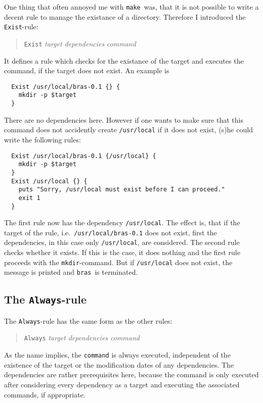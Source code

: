 \documentclass[12pt]{article}
\newcommand{\bras}{\texttt{bras}}
\newcommand{\make}{\texttt{make}}
\begin{document}
One thing that often annoyed me with \make\ was, that it is not
possible to write a decent rule to manage the existance of a
directory. Therefore I introduced the \texttt{Exist}-rule:
\begin{quote}
  \texttt{Exist} \textit{target} \textit{dependencies} \textit{command}
\end{quote}
It defines a rule which checks for the existance of the target and
executes the command, if the target does not exist.
An example is
\begin{verbatim}
  Exist /usr/local/bras-0.1 {} {
    mkdir -p $target
  }
\end{verbatim}
There are no dependencies here. However if one wants to make
sure that this command does not accidently create \texttt{/usr/local}
if it does not exist, (s)he could write the following rules:
\begin{verbatim}
  Exist /usr/local/bras-0.1 {/usr/local} {
    mkdir -p $target
  }
  Exist /usr/local {} {
    puts "Sorry, /usr/local must exist before I can proceed."
    exit 1
  }	
\end{verbatim}
The first rule now has the dependency \texttt{/usr/local}. The effect
is, that if the target of the rule, i.e.\ \texttt{/usr/local/bras-0.1}
does not exist, first the dependencies, in this case only
\texttt{/usr/local}, are considered. The second rule checks
whether it exists. If this is the case, it does nothing and the first
rule proceeds with the \texttt{mkdir}-command. But if
\texttt{/usr/local} does not exist, the message is printed and \bras\
is terminated.

\subsection{The \texttt{Always}-rule}

The \texttt{Always}-rule has the same form as the other rules:

\begin{quote}
  \texttt{Always} \textit{target} \textit{dependencies} \textit{command}
\end{quote}

As the name implies, the \texttt{command} is always executed,
independent of the existence of the target or the modification dates
of any dependencies. The dependencies are rather prerequisites here,
because the command is only executed after considering every
dependency as a target and executing the associated commands, if
appropriate.
\end{document}
